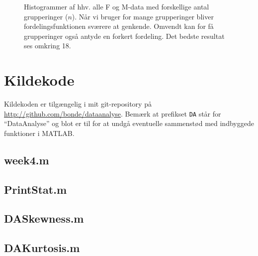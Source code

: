 \documentclass[a4paper, 10pt, danish, final]{article}
\def\repository{\url{http://github.com/bonde/dataanalyse}}
\begin{document}
\begin{figure}[!h]
    \caption[]{Histogrammer af hhv. alle F og M-data med forskellige
    antal grupperinger ($n$). Når vi bruger for mange grupperinger
    bliver fordelingsfunktionen sværere at genkende. Omvendt kan for få
    grupperinger også antyde en forkert fordeling. Det bedste resultat
    ses omkring 18.
    }
    \label{hists}
\end{figure}

\clearpage





\appendix
\lstset{language=Matlab, basicstyle=\scriptsize,
    showstringspaces=false, numbers=left, stepnumber=1,
    numberstyle=\tiny, frame=none}
\section{Kildekode}
Kildekoden er tilgængelig i mit git-repository på \repository{}. Bemærk
at prefikset \texttt{DA} står for ``DataAnalyse'' og blot er til for at
undgå eventuelle sammenstød med indbyggede funktioner i MATLAB.

\subsection{week4.m}


\subsection{PrintStat.m}


\subsection{DASkewness.m}


\subsection{DAKurtosis.m}

\end{document}
